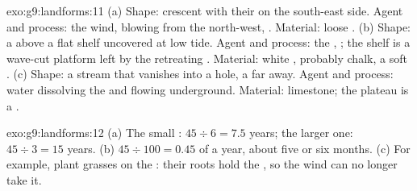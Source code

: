 \begin{solution}{exo:g9:landforms:11}
(a) Shape: crescent  with their  on the south-east side.
Agent and process: the wind, blowing from the north-west, .
Material: loose . (b) Shape: a  above a flat shelf uncovered at low
tide. Agent and process: the , ; the shelf is a wave-cut
platform left by the retreating . Material: white , probably
chalk, a soft . (c) Shape: a stream that vanishes into a hole, a 
far away. Agent and process: water dissolving the  and flowing
underground. Material: limestone; the plateau is a .
\end{solution}

\begin{solution}{exo:g9:landforms:12}
(a) The small : $45 \div 6 = 7.5$ years; the larger one: $45 \div 3 =
15$ years. (b) $45 \div 100 = 0.45$ of a year, about five or six months.
(c) For example, plant grasses on the : their roots hold the , so
the wind can no longer take it.
\end{solution}

